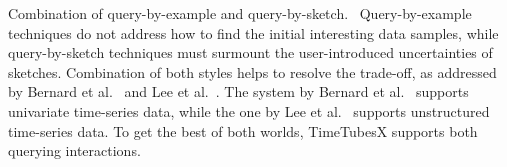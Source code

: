\textsf{Combination of query-by-example and query-by-sketch.\ }
Query-by-example techniques do not address how to find the initial interesting data samples, 
while query-by-sketch techniques must surmount the user-introduced uncertainties of sketches.
Combination of both styles helps to resolve the trade-off, as addressed by 
Bernard et al.~\cite{Bernard2010} and Lee et al.~\cite{Lee2019}. 
The system by Bernard et al.~\cite{Bernard2010} supports univariate time-series data, while the one by Lee et al.~\cite{Lee2019} supports unstructured time-series data.
To get the best of both worlds, TimeTubesX supports both querying interactions.
%




